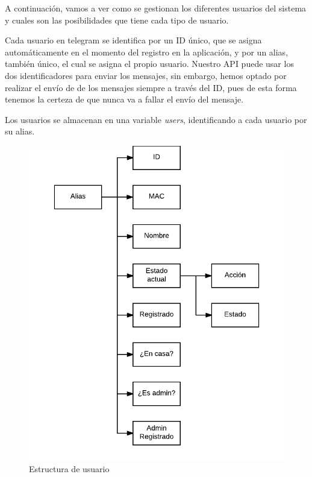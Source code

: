 \documentclass[10pt,journal,compsoc]{IEEEtran}
\begin{document}
A continuación, vamos a ver como se gestionan los diferentes usuarios del sistema y cuales 
son las posibilidades que tiene cada tipo de usuario.

Cada usuario en telegram se identifica por un ID único, que se asigna automáticamente en 
el momento del registro en la aplicación, y por un alias, también único, el cual se asigna el 
propio usuario. Nuestro API puede usar los dos identificadores para enviar los  mensajes, sin embargo, 
hemos optado por realizar el envío de de los mensajes siempre a través del ID, pues de esta forma 
tenemos la certeza de que nunca va a fallar el envío del mensaje. 

Los usuarios se almacenan en una variable \textit{users}, identificando a cada usuario por su alias.

\begin{figure}[h]
\centering
\includegraphics[scale=0.5]{UserEst}
\caption{Estructura de usuario}
\label{fig:UserEst}
\end{figure}
\end{document}
